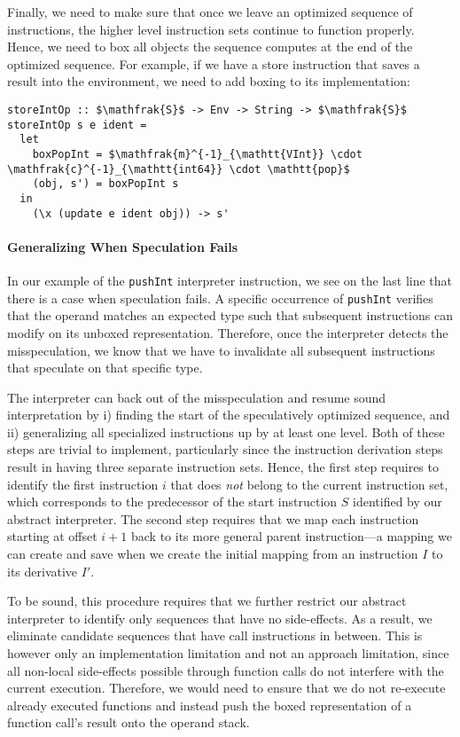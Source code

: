 \documentclass[preprint,10pt]{popl14conf}
\begin{document}
Finally, we need to make sure that once we leave an optimized sequence of instructions, the higher
level instruction sets continue to function properly.
Hence, we need to box all objects the sequence computes at the end of the optimized sequence.
For example, if we have a store instruction that saves a result into the environment, we need to
add boxing to its implementation:
\begin{lstlisting}[style=prettyhaskell]
storeIntOp :: $\mathfrak{S}$ -> Env -> String -> $\mathfrak{S}$
storeIntOp s e ident =
  let
    boxPopInt = $\mathfrak{m}^{-1}_{\mathtt{VInt}} \cdot \mathfrak{c}^{-1}_{\mathtt{int64}} \cdot \mathtt{pop}$
    (obj, s') = boxPopInt s
  in
    (\x (update e ident obj)) -> s'
\end{lstlisting}


\paragraph{Generalizing When Speculation Fails}
In our example of the \texttt{pushInt} interpreter instruction, we see on the last line that there
is a case when speculation fails.
A specific occurrence of \texttt{pushInt} verifies that the operand matches an expected type such
that subsequent instructions can modify on its unboxed representation.
Therefore, once the interpreter detects the misspeculation, we know that we have to invalidate all
subsequent instructions that speculate on that specific type.

The interpreter can back out of the misspeculation and resume sound interpretation by i) finding the
start of the speculatively optimized sequence, and ii) generalizing all specialized instructions up
by at least one level.
Both of these steps are trivial to implement, particularly since the instruction derivation
steps result in having three separate instruction sets.
Hence, the first step requires to identify the first instruction $i$ that does \emph{not} belong
to the current instruction set, which corresponds to the predecessor of the start instruction $S$
identified by our abstract interpreter.
The second step requires that we map each instruction starting at offset $i+1$ back to its more
general parent instruction---a mapping we can create and save when we create the initial mapping
from an instruction $I$ to its derivative $I'$.

To be sound, this procedure requires that we further restrict our abstract interpreter to identify
only sequences that have no side-effects.
As a result, we eliminate candidate sequences that have call instructions in between.
This is however only an implementation limitation and not an approach limitation, since all
non-local side-effects possible through function calls do not interfere with the current execution.
Therefore, we would need to ensure that we do not re-execute already executed functions and instead
push the boxed representation of a function call's result onto the operand stack.
\end{document}
